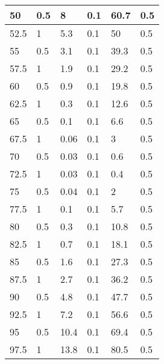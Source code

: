 \begin{center}
\begin{longtable}{|l|l|l|l|l|l|}
50    & 0.5         & 8               & 0.1         & 60.7          & 0.5           \\ \hline
52.5  & 1           & 5.3             & 0.1         & 50            & 0.5           \\ \hline
55    & 0.5         & 3.1             & 0.1         & 39.3          & 0.5           \\ \hline
57.5  & 1           & 1.9             & 0.1         & 29.2          & 0.5           \\ \hline
60    & 0.5         & 0.9             & 0.1         & 19.8          & 0.5           \\ \hline
62.5  & 1           & 0.3             & 0.1         & 12.6          & 0.5           \\ \hline
65    & 0.5         & 0.1             & 0.1         & 6.6           & 0.5           \\ \hline
67.5  & 1           & 0.06            & 0.1         & 3             & 0.5           \\ \hline
70    & 0.5         & 0.03            & 0.1         & 0.6           & 0.5           \\ \hline
72.5  & 1           & 0.03            & 0.1         & 0.4           & 0.5           \\ \hline
75    & 0.5         & 0.04            & 0.1         & 2             & 0.5           \\ \hline
77.5  & 1           & 0.1             & 0.1         & 5.7           & 0.5           \\ \hline
80    & 0.5         & 0.3             & 0.1         & 10.8          & 0.5           \\ \hline
82.5  & 1           & 0.7             & 0.1         & 18.1          & 0.5           \\ \hline
85    & 0.5         & 1.6             & 0.1         & 27.3          & 0.5           \\ \hline
87.5  & 1           & 2.7             & 0.1         & 36.2          & 0.5           \\ \hline
90    & 0.5         & 4.8             & 0.1         & 47.7          & 0.5           \\ \hline
92.5  & 1           & 7.2             & 0.1         & 56.6          & 0.5           \\ \hline
95    & 0.5         & 10.4            & 0.1         & 69.4          & 0.5           \\ \hline
97.5  & 1           & 13.8            & 0.1         & 80.5          & 0.5           \\ \hline

\end{longtable}
\end{center}
